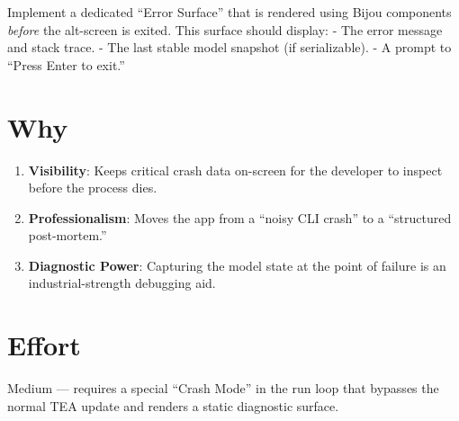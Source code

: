 Implement a dedicated ``Error Surface'' that is rendered using Bijou components \emph{before} the alt-screen is exited. This surface should display: - The error message and stack trace. - The last stable model snapshot (if serializable). - A prompt to ``Press Enter to exit.''

\section{Why}\label{record-321-why}

\begin{enumerate}
\def\labelenumi{\arabic{enumi}.}
\tightlist
\item
  \textbf{Visibility}: Keeps critical crash data on-screen for the developer to inspect before the process dies.
\item
  \textbf{Professionalism}: Moves the app from a ``noisy CLI crash'' to a ``structured post-mortem.''
\item
  \textbf{Diagnostic Power}: Capturing the model state at the point of failure is an industrial-strength debugging aid.
\end{enumerate}

\section{Effort}\label{record-321-effort}

Medium --- requires a special ``Crash Mode'' in the run loop that bypasses the normal TEA update and renders a static diagnostic surface.

